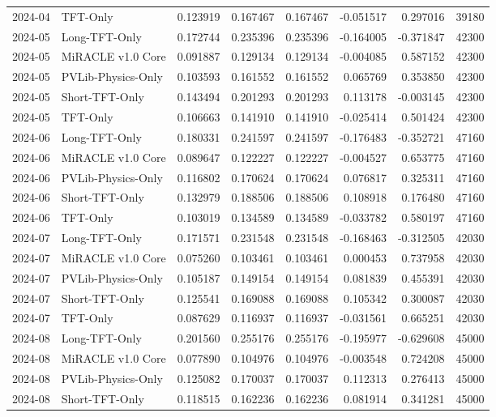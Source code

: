 \begin{tabular}{llrrrrrr}
2024-04 & TFT-Only & 0.123919 & 0.167467 & 0.167467 & -0.051517 & 0.297016 & 39180 \\
2024-05 & Long-TFT-Only & 0.172744 & 0.235396 & 0.235396 & -0.164005 & -0.371847 & 42300 \\
2024-05 & MiRACLE v1.0 Core & 0.091887 & 0.129134 & 0.129134 & -0.004085 & 0.587152 & 42300 \\
2024-05 & PVLib-Physics-Only & 0.103593 & 0.161552 & 0.161552 & 0.065769 & 0.353850 & 42300 \\
2024-05 & Short-TFT-Only & 0.143494 & 0.201293 & 0.201293 & 0.113178 & -0.003145 & 42300 \\
2024-05 & TFT-Only & 0.106663 & 0.141910 & 0.141910 & -0.025414 & 0.501424 & 42300 \\
2024-06 & Long-TFT-Only & 0.180331 & 0.241597 & 0.241597 & -0.176483 & -0.352721 & 47160 \\
2024-06 & MiRACLE v1.0 Core & 0.089647 & 0.122227 & 0.122227 & -0.004527 & 0.653775 & 47160 \\
2024-06 & PVLib-Physics-Only & 0.116802 & 0.170624 & 0.170624 & 0.076817 & 0.325311 & 47160 \\
2024-06 & Short-TFT-Only & 0.132979 & 0.188506 & 0.188506 & 0.108918 & 0.176480 & 47160 \\
2024-06 & TFT-Only & 0.103019 & 0.134589 & 0.134589 & -0.033782 & 0.580197 & 47160 \\
2024-07 & Long-TFT-Only & 0.171571 & 0.231548 & 0.231548 & -0.168463 & -0.312505 & 42030 \\
2024-07 & MiRACLE v1.0 Core & 0.075260 & 0.103461 & 0.103461 & 0.000453 & 0.737958 & 42030 \\
2024-07 & PVLib-Physics-Only & 0.105187 & 0.149154 & 0.149154 & 0.081839 & 0.455391 & 42030 \\
2024-07 & Short-TFT-Only & 0.125541 & 0.169088 & 0.169088 & 0.105342 & 0.300087 & 42030 \\
2024-07 & TFT-Only & 0.087629 & 0.116937 & 0.116937 & -0.031561 & 0.665251 & 42030 \\
2024-08 & Long-TFT-Only & 0.201560 & 0.255176 & 0.255176 & -0.195977 & -0.629608 & 45000 \\
2024-08 & MiRACLE v1.0 Core & 0.077890 & 0.104976 & 0.104976 & -0.003548 & 0.724208 & 45000 \\
2024-08 & PVLib-Physics-Only & 0.125082 & 0.170037 & 0.170037 & 0.112313 & 0.276413 & 45000 \\
2024-08 & Short-TFT-Only & 0.118515 & 0.162236 & 0.162236 & 0.081914 & 0.341281 & 45000 \\

\end{tabular}
